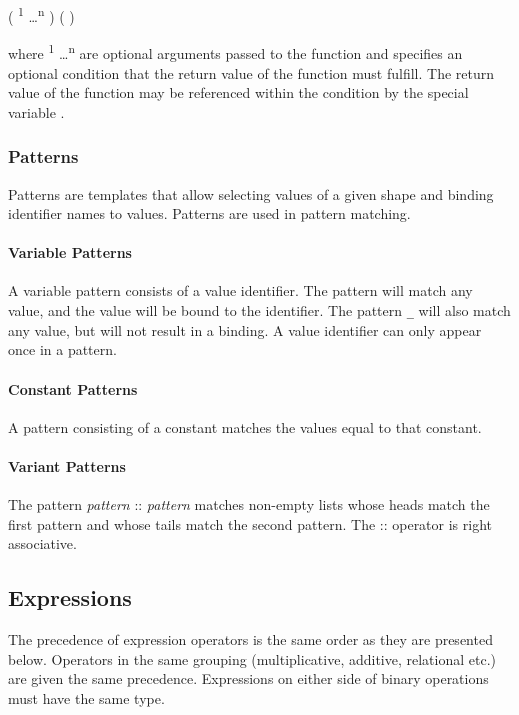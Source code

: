 \quad \term{\midtilde}  ( \textsuperscript{1} \dots {}\textsuperscript{n} ) ( \term{|}  ) 

where  \textsuperscript{1} \dots {}\textsuperscript{n}  are optional arguments passed to the function and \term{|}  specifies an optional condition that the return value of the function must fulfill. The return value of the function may be referenced within the condition by the special variable \term{\$}.

\subsubsection{Patterns} 
Patterns are templates that allow selecting values of a given shape and binding identifier names to values. Patterns are used in pattern matching. 

\paragraph{Variable Patterns}
A variable pattern consists of a value identifier. The pattern will match any value, and the value will be bound to the identifier. The pattern \texttt{\_} will also match any value, but will not result in a binding. A value identifier can only appear once in a pattern.

\paragraph{Constant Patterns}
A pattern consisting of a constant matches the values equal to that constant.

\paragraph{Variant Patterns}
The pattern \textit{pattern} :: \textit{pattern} matches non-empty lists whose heads match the first pattern and whose tails match the second pattern. The :: operator is right associative.

\subsection{Expressions}

The precedence of expression operators is the same order as they are presented below. Operators in the same grouping (multiplicative, additive, relational etc.) are given the same precedence. Expressions on either side of binary operations must have the same type. 

